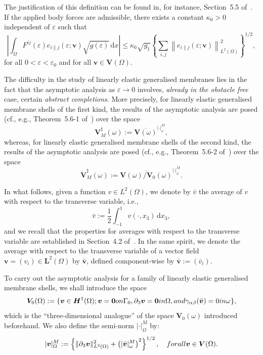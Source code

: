 \documentclass{amsart}
\def\dd{\, \mathrm{d}}
\begin{document}
The justification of this definition can be found in, for instance, Section~5.5 of~\cite{Ciarlet2000}. If the applied body forces are admissible, there exists a constant $\kappa_0>0$ independent of $\varepsilon$ such that
\begin{equation}
	\label{adm-2}
\left|\int_{\Omega} F^{ij}(\varepsilon) e_{i\|j}(\varepsilon;\bm{v}) \sqrt{g(\varepsilon)} \dd x\right| \le \kappa_0\sqrt{g_1} \left\{\sum_{i,j}\left\|e_{i\|j}(\varepsilon;\bm{v})\right\|_{L^2(\Omega)}^2\right\}^{1/2},
\end{equation}
for all $0<\varepsilon<\varepsilon_0$ and for all $\bm{v}\in\bm{V}(\Omega)$.

The difficulty in the study of linearly elastic generalised membranes lies in the fact that the asymptotic analysis as $\varepsilon \to 0$ involves, \emph{already in the obstacle free} case, certain \emph{abstract completions}. More precisely, for linearly elastic generalised membrane shells of the first kind, the results of the asymptotic analysis are posed (cf., e.g., Theorem~5.6-1 of~\cite{Ciarlet2000}) over the space
\begin{equation*}
	\bm{V}_M^\sharp(\omega):=\overline{\bm{V}(\omega)}^{|\cdot|_\omega^M},
\end{equation*}
whereas, for linearly elastic generalised membrane shells of the second kind, the results of the asymptotic analysis are posed (cf., e.g., Theorem~5.6-2 of~\cite{Ciarlet2000}) over the space
\begin{equation*}
	\dot{\bm{V}}_M^\sharp(\omega):=\overline{\bm{V}(\omega)/\bm{V}_0(\omega)}^{|\cdot|_\omega^M}.
\end{equation*}

In what follows, given a function $v \in L^2(\Omega)$, we denote by $\bar{v}$ the average of $v$ with respect to the transverse variable, i.e., 
\begin{equation*}
	\bar{v}:=\dfrac{1}{2}\int_{-1}^{1} v(\cdot,x_3) \dd x_3,
\end{equation*}
and we recall that the properties for averages with respect to the transverse variable are established in Section~4.2 of~\cite{Ciarlet2000}. In the same spirit, we denote the average with respect to the transverse variable of a vector field $\bm{v}=(v_i) \in \bm{L}^2(\Omega)$ by $\bar{\bm{v}}$, defined component-wise by $\bar{\bm{v}}:=\left(\bar{v}_i\right)$.

To carry out the asymptotic analysis for a family of linearly elastic generalised membrane shells, we shall introduce the space
\begin{equation*}
	\bm{V}_0(\Omega):=\{\bm{v} \in \bm{H}^1(\Omega);\bm{v}=\bm{0} \textup{ on }\Gamma_0, \partial_3\bm{v}=\bm{0} \textup{ in }\Omega, \textup{ and } \gamma_{\alpha\beta}(\bar{\bm{v}})=0 \textup{ in }\omega\},
\end{equation*}
which is the ``three-dimensional analogue'' of the space $\bm{V}_0(\omega)$ introduced beforehand. We also define the semi-norm $|\cdot|_\Omega^M$ by:
\begin{equation*}
	|\bm{v}|_\Omega^M:=\left\{\|\partial_3\bm{v}\|_{L^2(\Omega)}^2+\left(|\bar{\bm{v}}|_\omega^M\right)^2\right\}^{1/2},\quad\textup{ for all } \bm{v} \in \bm{V}(\Omega).
\end{equation*}
\end{document}

